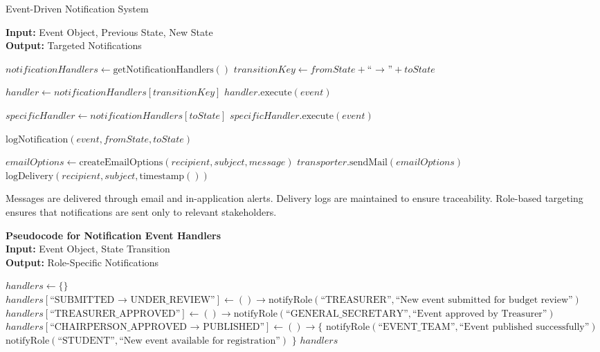 \begin{algorithm}[H]
\caption{Event-Driven Notification System}
\label{alg:notification_system}
\textbf{Input:} Event Object, Previous State, New State\\
\textbf{Output:} Targeted Notifications
\begin{algorithmic}[1]
    \State $notificationHandlers \gets \text{getNotificationHandlers}()$
    \State $transitionKey \gets fromState + \text{`` → ''} + toState$
    
        \State $handler \gets notificationHandlers[transitionKey]$
        \State $handler.\text{execute}(event)$
    \EndIf
    
        \State $specificHandler \gets notificationHandlers[toState]$
        \State $specificHandler.\text{execute}(event)$
    \EndIf
    
    \State $\text{logNotification}(event, fromState, toState)$
\EndFunction

        \State $emailOptions \gets \text{createEmailOptions}(recipient, subject, message)$
        \State $transporter.\text{sendMail}(emailOptions)$
        \State $\text{logDelivery}(recipient, subject, \text{timestamp}())$
    \EndFor
\EndFunction
\end{algorithmic}
\end{algorithm}

Messages are delivered through email and in-application alerts. Delivery logs are maintained to ensure traceability. Role-based targeting ensures that notifications are sent only to relevant stakeholders.

\noindent\textbf{Pseudocode for Notification Event Handlers} 
\vspace{.2em} \\
\noindent\textbf{Input:} Event Object, State Transition\\
\noindent\textbf{Output:} Role-Specific Notifications
\begin{algorithmic}[1]
    \State $handlers \gets \{\}$
    \State $handlers[\text{``SUBMITTED → UNDER\_REVIEW''}] \gets () \rightarrow \text{notifyRole}(\text{``TREASURER''}, \text{``New event submitted for budget review''})$
    \State $handlers[\text{``TREASURER\_APPROVED''}] \gets () \rightarrow \text{notifyRole}(\text{``GENERAL\_SECRETARY''}, \text{``Event approved by Treasurer''})$
    \State $handlers[\text{``CHAIRPERSON\_APPROVED → PUBLISHED''}] \gets () \rightarrow \{$
    \State \hspace{1em} $\text{notifyRole}(\text{``EVENT\_TEAM''}, \text{``Event published successfully''})$
    \State \hspace{1em} $\text{notifyRole}(\text{``STUDENT''}, \text{``New event available for registration''})$
    \State $\}$
    \State \Return $handlers$
\EndFunction
\end{algorithmic}

